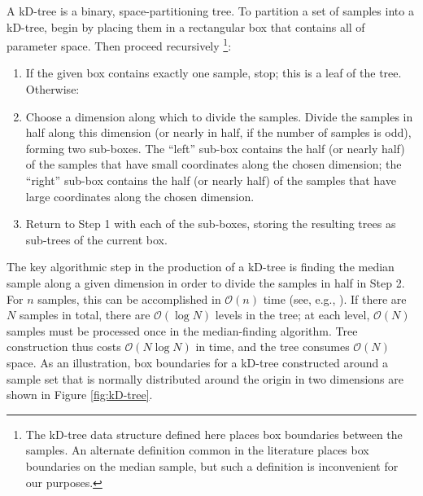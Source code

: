 \documentclass{rsos}
\newcommand{\order}[1]{\mathcal{O}\left( #1 \right)}
\begin{document}
A kD-tree is a binary, space-partitioning tree.  To partition a set of
samples into a kD-tree, begin by placing them in a rectangular box that
contains all of parameter space.  Then proceed recursively%
\footnote{The kD-tree data structure defined here places box boundaries
  between the samples.  An alternate definition common in the
  literature places box boundaries on the median sample, but such a
  definition is inconvenient for our purposes.}: %
\begin{enumerate}
\item If the given box contains exactly one sample, stop; this is a
  leaf of the tree.  Otherwise:
\item Choose a dimension along which to divide the samples.  Divide the
  samples in half along this dimension (or nearly in half, if the
  number of samples is odd), forming two sub-boxes.  The ``left''
  sub-box contains the half (or nearly half) of the samples that have
  small coordinates along the chosen dimension; the ``right'' sub-box
  contains the half (or nearly half) of the samples that have large
  coordinates along the chosen dimension.
\item Return to Step 1 with each of the sub-boxes, storing the
  resulting trees as sub-trees of the current box.
\end{enumerate}
The key algorithmic step in the production of a kD-tree is finding the
median sample along a given dimension in order to divide the samples in
half in Step 2.  For $n$ samples, this can be accomplished in
$\order{n}$ time (see, e.g., \cite{Press2007}).  If there are $N$
samples in total, there are $\order{\log N}$ levels in the tree; at
each level, $\order{N}$ samples must be processed once in the
median-finding algorithm.  Tree construction thus costs $\order{N \log
  N}$ in time, and the tree consumes $\order{N}$ space.  As an
illustration, box boundaries for a kD-tree constructed around a sample
set that is normally distributed around the origin in two dimensions
are shown in Figure \ref{fig:kD-tree}.
\end{document}
